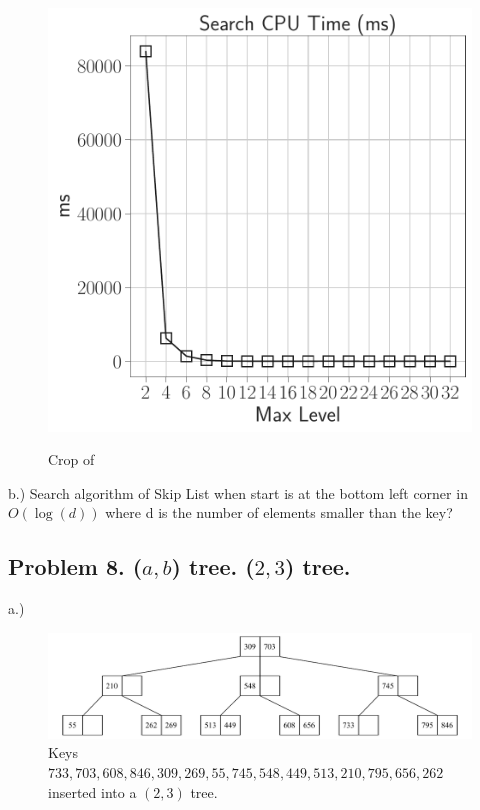\documentclass[12pt]{article}
\begin{document}
\begin{figure}[H]
\begin{minipage}{0.32\textwidth}
		\label{fig:physical_memory}
	\end{minipage}\hfill\
	\begin{minipage}{0.32\textwidth}
		\centering
		\includegraphics[width=\linewidth]{../notebook/plot/sl_maxlevel_search_cpu_time_(ms).pdf}
		\label{fig:physical_memory}
	\end{minipage}\hfill
	\caption{Crop of }
\end{figure}


b.) Search algorithm of Skip List when start is at the bottom left corner in $O(\log(d))$ where d is the number of elements smaller than the key?
	

	
	\vspace{2in} %
	
	
	\pagebreak
	\subsection*{Problem 8. ($a,b$) tree. ($2, 3$) tree.}

	a.)	
	\begin{figure}[H] 
		\centering
		\includegraphics[width=0.9\linewidth]{Q8_a.drawio}
		\caption{Keys $733, 703, 608, 846, 309, 269, 55, 745, 548, 449, 513, 210, 795, 656, 262$ inserted into a $(2, 3)$ tree.}
		\label{fig:q8a}
	\end{figure}
	
\end{document}
